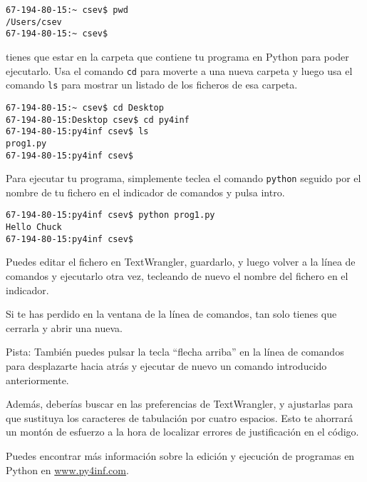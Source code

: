 \beforeverb
\begin{verbatim}
67-194-80-15:~ csev$ pwd
/Users/csev
67-194-80-15:~ csev$ 
\end{verbatim}
\afterverb
%
tienes que estar en la carpeta que contiene tu programa en Python
para poder ejecutarlo. Usa el comando {\tt cd} para moverte a una nueva carpeta
y luego usa el comando {\tt ls} para mostrar un listado de los ficheros
de esa carpeta.

\beforeverb
\begin{verbatim}
67-194-80-15:~ csev$ cd Desktop
67-194-80-15:Desktop csev$ cd py4inf
67-194-80-15:py4inf csev$ ls
prog1.py
67-194-80-15:py4inf csev$ 
\end{verbatim}
\afterverb
%
Para ejecutar tu programa, simplemente teclea el comando {\tt python} seguido
por el nombre de tu fichero en el indicador de comandos y pulsa intro.

\beforeverb
\begin{verbatim}
67-194-80-15:py4inf csev$ python prog1.py
Hello Chuck
67-194-80-15:py4inf csev$ 
\end{verbatim}
\afterverb
%
Puedes editar el fichero en TextWrangler, guardarlo, y luego volver
a la línea de comandos y ejecutarlo otra vez, tecleando de nuevo
el nombre del fichero en el indicador.

Si te has perdido en la ventana de la línea de comandos, tan solo tienes
que cerrarla y abrir una nueva.

Pista: También puedes pulsar la tecla ``flecha arriba'' en la línea de comandos para
desplazarte hacia atrás y ejecutar de nuevo un comando introducido anteriormente.

Además, deberías buscar en las preferencias de TextWrangler, y ajustarlas para
que sustituya los caracteres de tabulación por cuatro espacios. Esto te ahorrará
un montón de esfuerzo a la hora de localizar errores de justificación en el código.

Puedes encontrar más información sobre la edición y ejecución de
programas en Python en \url{www.py4inf.com}.


